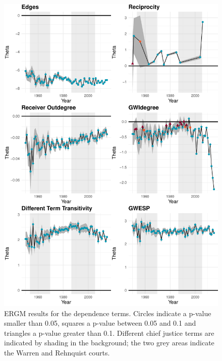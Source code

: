 \documentclass{cup-pan}
\begin{document}
\begin{figure}
\centering
\includegraphics[width=14cm ]{SCC_results_1.pdf}
\caption{ERGM results for the dependence terms. Circles indicate a p-value smaller than 0.05, squares a p-value between 0.05 and 0.1 and triangles a p-value greater than 0.1. Different chief justice terms are indicated by shading in the background; the two grey areas indicate the Warren and Rehnquist courts.}
 \label{SCC_results_1}
\end{figure}
\end{document}
